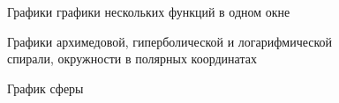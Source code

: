 \documentclass[10pt, a5paper]{article}
\begin{document}
\begin{figure}[ht]
\caption{Графики графики нескольких функций в одном окне}
\label{pic:1}
\end{figure}

\begin{figure}[ht]
\caption{Графики архимедовой, гиперболической и логарифмической спирали, окружности в полярных координатах}
\label{pic:2}
\end{figure}

\begin{figure}[ht]
\caption{График сферы}
\label{pic:3}
\end{figure}
\end{document}
